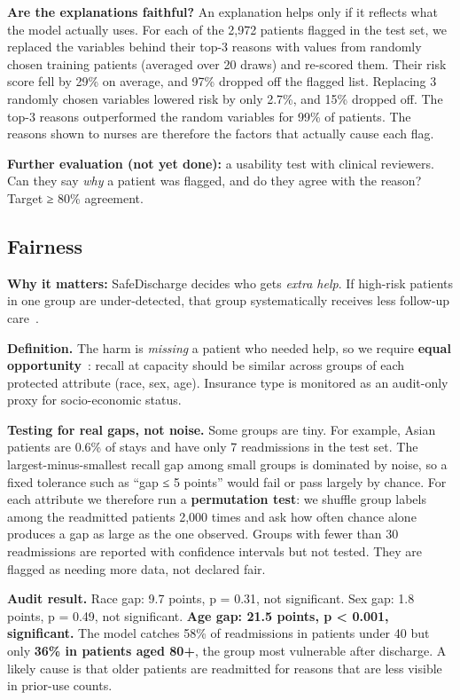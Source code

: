 \documentclass[10pt,a4paper]{article}
\begin{document}
\textbf{Are the explanations faithful?} An explanation helps only if it reflects what the model actually uses. For each of the 2,972 patients flagged in the test set, we replaced the variables behind their top-3 reasons with values from randomly chosen training patients (averaged over 20 draws) and re-scored them. Their risk score fell by 29\% on average, and 97\% dropped off the flagged list. Replacing 3 randomly chosen variables lowered risk by only 2.7\%, and 15\% dropped off. The top-3 reasons outperformed the random variables for 99\% of patients. The reasons shown to nurses are therefore the factors that actually cause each flag.

\textbf{Further evaluation (not yet done):} a usability test with clinical reviewers. Can they say \emph{why} a patient was flagged, and do they agree with the reason? Target ≥ 80\% agreement.

\subsection{Fairness}\label{sec:4.2}

\textbf{Why it matters:} SafeDischarge decides who gets \emph{extra help}. If high-risk patients in one group are under-detected, that group systematically receives less follow-up care~\cite{obermeyer2019}.

\textbf{Definition.} The harm is \emph{missing} a patient who needed help, so we require \textbf{equal opportunity}~\cite{hardt2016}: recall at capacity should be similar across groups of each protected attribute (race, sex, age). Insurance type is monitored as an audit-only proxy for socio-economic status.

\textbf{Testing for real gaps, not noise.} Some groups are tiny. For example, Asian patients are 0.6\% of stays and have only 7 readmissions in the test set. The largest-minus-smallest recall gap among small groups is dominated by noise, so a fixed tolerance such as “gap ≤ 5 points” would fail or pass largely by chance. For each attribute we therefore run a \textbf{permutation test}: we shuffle group labels among the readmitted patients 2,000 times and ask how often chance alone produces a gap as large as the one observed. Groups with fewer than 30 readmissions are reported with confidence intervals but not tested. They are flagged as needing more data, not declared fair.

\textbf{Audit result.} Race gap: 9.7 points, p = 0.31, not significant. Sex gap: 1.8 points, p = 0.49, not significant. \textbf{Age gap: 21.5 points, p < 0.001, significant.} The model catches 58\% of readmissions in patients under 40 but only \textbf{36\% in patients aged 80+}, the group most vulnerable after discharge. A likely cause is that older patients are readmitted for reasons that are less visible in prior-use counts.
\end{document}
